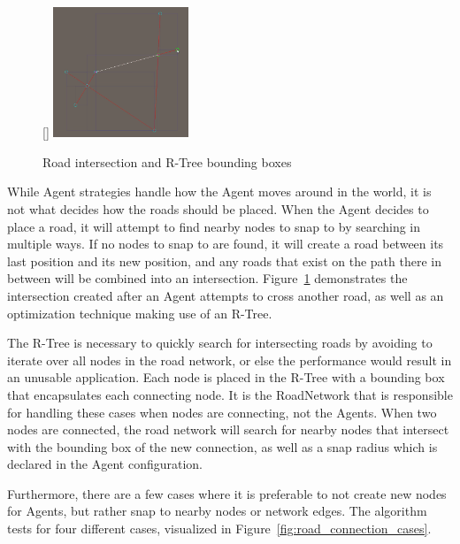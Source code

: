
\begin{figure}
  \centering
  \raisebox{0pt}[\dimexpr{}\baselineskip\relax]{
    \includegraphics[width=0.36\textwidth]{figure/road_intersection.png}
  }

  \caption{Road intersection and R-Tree bounding boxes}

  \label{fig:road_intersection}
\end{figure}

While Agent strategies handle how the Agent moves around in the world, it is not what decides how the roads should be placed.
When the Agent decides to place a road, it will attempt to find nearby nodes to snap to by searching in multiple ways.
If no nodes to snap to are found, it will create a road between its last position and its new position, and any roads that exist on the path there in between will be combined into an intersection.
Figure~\ref{fig:road_intersection} demonstrates the intersection created after an Agent attempts to cross another road, as well as an optimization technique making use of an R-Tree. %

The R-Tree is necessary to quickly search for intersecting roads by avoiding to iterate over all nodes in the road network, or else the performance would result in an unusable application.
Each node is placed in the R-Tree with a bounding box that encapsulates each connecting node.
It is the RoadNetwork that is responsible for handling these cases when nodes are connecting, not the Agents.
When two nodes are connected, the road network will search for nearby nodes that intersect with the bounding box of the new connection, as well as a snap radius which is declared in the Agent configuration.

Furthermore, there are a few cases where it is preferable to not create new nodes for Agents, but rather snap to nearby nodes or network edges.
The algorithm tests for four different cases, visualized in Figure~\ref{fig:road_connection_cases}.

